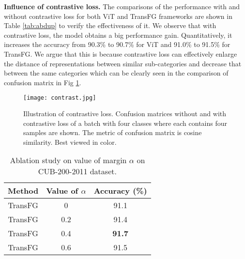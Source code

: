 \noindent \textbf{Influence of contrastive loss.} The comparisons of the performance with and without contrastive loss for both ViT and TransFG frameworks are shown in Table \ref{tab:abdup} to verify the effectiveness of it. We observe that with contrastive loss, the model obtains a big performance gain. Quantitatively, it increases the accuracy from 90.3\% to 90.7\% for ViT and 91.0\% to 91.5\% for TransFG. We argue that this is because contrastive loss can effectively enlarge the distance of representations between similar sub-categories and decrease that between the same categories which can be clearly seen in the comparison of confusion matrix in Fig \ref{fig:confusion}.

\begin{figure}[h]
    \centering
    \texttt{[image: contrast.jpg]}
    \caption{Illustration of contrastive loss. Confusion matrices without and with contrastive loss of a batch with four classes where each contains four samples are shown. The metric of confusion matrix is cosine similarity. Best viewed in color.}
    \label{fig:confusion}
\end{figure}

\begin{table}[]
    \small
    \centering
    \caption{Ablation study on value of margin $\alpha$ on CUB-200-2011 dataset.}
    \label{tab:abalpha}
    \begin{tabular}{|c|c|c|}
    \hline
    Method & Value of $\alpha$ & Accuracy (\%) \\ \hline
    TransFG & 0 & 91.1 \\ 
    TransFG & 0.2 & 91.4 \\ 
    TransFG & 0.4 & \textbf{91.7} \\ 
    TransFG & 0.6 & 91.5 \\ \hline
    \end{tabular}
\end{table}

